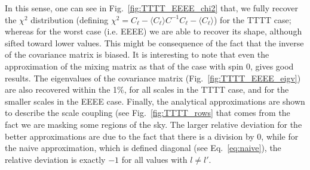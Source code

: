 \documentclass[useAMS,usenatbib]{mn2e}
\newcommand{\cl}{C_\ell}
\begin{document}
In this sense, one can see in Fig.~\ref{fig:TTTT_EEEE_chi2} that, we fully
recover the $\chi^2$ distribution (defining $\chi^2 = \cl - \langle \cl
\rangle C^{-1} \cl - \langle \cl \rangle$) for the TTTT case; whereas for the
worst case (i.e. EEEE) we are able to recover its shape, although sifted
toward lower values. This might be consequence of the fact that the inverse of
the covariance matrix is biased. It is interesting to note that even
the approximation of the mixing matrix as that of the case with spin 0, gives
good results. The eigenvalues of the covariance matrix
(Fig.~\ref{fig:TTTT_EEEE_eigv}) are also recovered within the 1\%, for all
scales in the TTTT case, and for the smaller scales in the EEEE case. Finally,
the analytical approximations are shown to describe the scale coupling (see
Fig.~\ref{fig:TTTT_rows} that comes from the fact we are masking some regions
of the sky. The larger relative deviation for the better approximations are
due to the fact that there is a division by $0$, while for the naive
approximation, which is defined diagonal (see Eq.~\ref{eq:naive}), the
relative deviation is exactly $-1$ for all values with $l \neq l'$.
\end{document}
